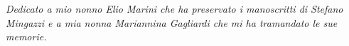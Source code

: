\thispagestyle{empty}
\vspace*{2cm}

\begin{flushright}
	\large
	\itshape{\noindent Dedicato a mio nonno Elio Marini che ha preservato i manoscritti di Stefano Mingazzi e a mia nonna Mariannina Gagliardi che mi ha tramandato le sue memorie.\\}
	\vspace{1cm}
	\Huge{}
\end{flushright}
